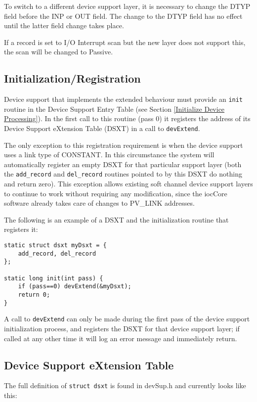 To switch to a different device support layer, it is necessary to change the DTYP field before the INP or OUT field. The 
change to the DTYP field has no effect until the latter field change takes place.

If a record is set to I/O Interrupt scan but the new layer does not support this, the scan will be changed to Passive.

\subsection{Initialization/Registration}

Device support that implements the extended behaviour must provide an \verb|init| routine in the Device Support Entry Table 
(see Section \ref{Initialize Device Processing}).
In the first call to this routine (pass 0) it registers the address of its Device Support eXtension Table (DSXT) in a call to \verb|devExtend|.

The only exception to this registration requirement is when the device support uses a link type of CONSTANT.  In this 
circumstance the system will automatically register an empty DSXT for that particular support layer (both the 
\verb|add_record| and \verb|del_record| routines pointed to by this DSXT do nothing and return zero). This exception allows 
existing soft channel device support layers to continue to work without requiring any modification, since the iocCore 
software already takes care of changes to PV\_LINK addresses.

The following is an example of a DSXT and the initialization routine that registers it:

\begin{verbatim}
static struct dsxt myDsxt = {
    add_record, del_record
};

static long init(int pass) {
    if (pass==0) devExtend(&myDsxt);
    return 0;
}
\end{verbatim}

A call to \verb|devExtend| can only be made during the first pass of the device support initialization process, and registers the 
DSXT for that device support layer; if called at any other time it will log an error message and immediately return.

\subsection{Device Support eXtension Table}

The full definition of \verb|struct dsxt| is found in devSup.h and currently looks like this:

